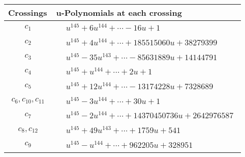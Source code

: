 \documentclass[1p]{elsarticle_modified}
\theoremstyle{definition}
\begin{document}
\begin{tabular}{m{50pt}|m{274pt}}
Crossings & \hspace{64pt}u-Polynomials at each crossing \\
\hline $$\begin{aligned}c_{1}\end{aligned}$$&$\begin{aligned}
&u^{145}+6 u^{144}+\cdots-16 u+1
\end{aligned}$\\
\hline $$\begin{aligned}c_{2}\end{aligned}$$&$\begin{aligned}
&u^{145}+4 u^{144}+\cdots+185515060 u+38279399
\end{aligned}$\\
\hline $$\begin{aligned}c_{3}\end{aligned}$$&$\begin{aligned}
&u^{145}-35 u^{143}+\cdots-85631889 u+14144791
\end{aligned}$\\
\hline $$\begin{aligned}c_{4}\end{aligned}$$&$\begin{aligned}
&u^{145}+u^{144}+\cdots+2 u+1
\end{aligned}$\\
\hline $$\begin{aligned}c_{5}\end{aligned}$$&$\begin{aligned}
&u^{145}+12 u^{144}+\cdots-13174228 u+7328689
\end{aligned}$\\
\hline $$\begin{aligned}c_{6},c_{10},c_{11}\end{aligned}$$&$\begin{aligned}
&u^{145}-3 u^{144}+\cdots+30 u+1
\end{aligned}$\\
\hline $$\begin{aligned}c_{7}\end{aligned}$$&$\begin{aligned}
&u^{145}-2 u^{144}+\cdots+14370450736 u+2642976587
\end{aligned}$\\
\hline $$\begin{aligned}c_{8},c_{12}\end{aligned}$$&$\begin{aligned}
&u^{145}+49 u^{143}+\cdots+1759 u+541
\end{aligned}$\\
\hline $$\begin{aligned}c_{9}\end{aligned}$$&$\begin{aligned}
&u^{145}- u^{144}+\cdots+962205 u+328951
\end{aligned}$\\
\hline
\end{tabular}\\~\\
\end{document}
